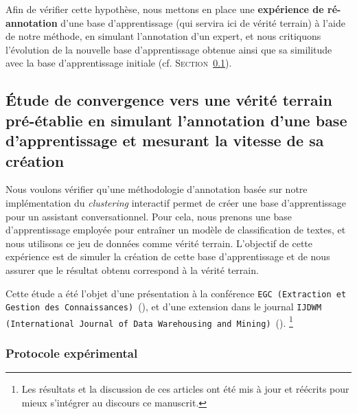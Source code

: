 	Afin de vérifier cette hypothèse, nous mettons en place une \textbf{expérience de ré-annotation} d'une base d'apprentissage (qui servira ici de vérité terrain) à l'aide de notre méthode, en simulant l'annotation d'un expert, et nous critiquons l'évolution de la nouvelle base d'apprentissage obtenue ainsi que sa similitude avec la base d'apprentissage initiale (cf. \textsc{Section~\ref{section:4.1.1-ETUDE-CONVERGENCE}}).
	
	
	\subsection{Étude de convergence vers une vérité terrain pré-établie en simulant l'annotation d'une base d'apprentissage et mesurant la vitesse de sa création}
	\label{section:4.1.1-ETUDE-CONVERGENCE}
		
		Nous voulons vérifier qu'une méthodologie d'annotation basée sur notre implémentation du \textit{clustering} interactif permet de créer une base d'apprentissage pour un assistant conversationnel.
		Pour cela, nous prenons une base d'apprentissage employée pour entraîner un modèle de classification de textes, et nous utilisons ce jeu de données comme vérité terrain.
		L'objectif de cette expérience est de simuler la création de cette base d'apprentissage et de nous assurer que le résultat obtenu correspond à la vérité terrain.
			
		\begin{leftBarInformation}
			Cette étude a été l'objet d'une présentation à la conférence \texttt{EGC (Extraction et Gestion des Connaissances)}~(\cite{schild-etal:2021:conception-iterative-semisupervisee}), et d'une extension dans le journal \texttt{IJDWM (International Journal of Data Warehousing and Mining)}~(\cite{schild-etal:2022:iterative-semisupervised-design}).
			\footnote{
				Les résultats et la discussion de ces articles ont été mis à jour et réécrits pour mieux s'intégrer au discours ce manuscrit.
			}
		\end{leftBarInformation}

		\subsubsection{Protocole expérimental}
			
